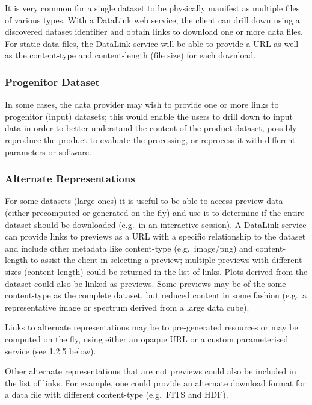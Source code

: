 \documentclass[11pt,a4paper]{ivoa}
\begin{document}
It is very common for a single dataset to be physically manifest as
multiple files of various types. With a DataLink web service, the client
can drill down using a discovered dataset identifier and obtain links to
download one or more data files.  For static data files, the DataLink
service will be able to provide a URL as well as the content-type and
content-length (file size) for each download.


\subsubsection{Progenitor Dataset}

In some cases, the data provider may wish to provide one or more links to
progenitor (input) datasets; this would enable the users to drill down
to input data in order to better understand the content of the product
dataset, possibly reproduce the product to evaluate the processing,
or reprocess it with different parameters or software.


\subsubsection{Alternate Representations}

For some datasets (large ones) it is useful to be able to access
preview data (either precomputed or generated on-the-fly) and use it
to determine if the entire dataset should be downloaded (e.g.\ in an
interactive session). A DataLink service can provide links to previews
as a URL with a specific relationship to the dataset and include other
metadata like content-type (e.g.\ image/png) and content-length to assist
the client in selecting a preview; multiple previews with different sizes
(content-length) could be returned in the list of links. Plots derived
from the dataset could also be linked as previews. Some previews may be
of the some content-type as the complete dataset, but reduced content
in some fashion (e.g.\ a representative image or spectrum derived from
a large data cube).

Links to alternate representations may be to pre-generated resources
or may be computed on the fly, using either an opaque URL or a custom
parameterised service (see 1.2.5 below).

Other alternate representations that are not previews could also
be included in the list of links. For example, one could provide an
alternate download format for a data file with different content-type
(e.g.\ FITS and HDF).
\end{document}
